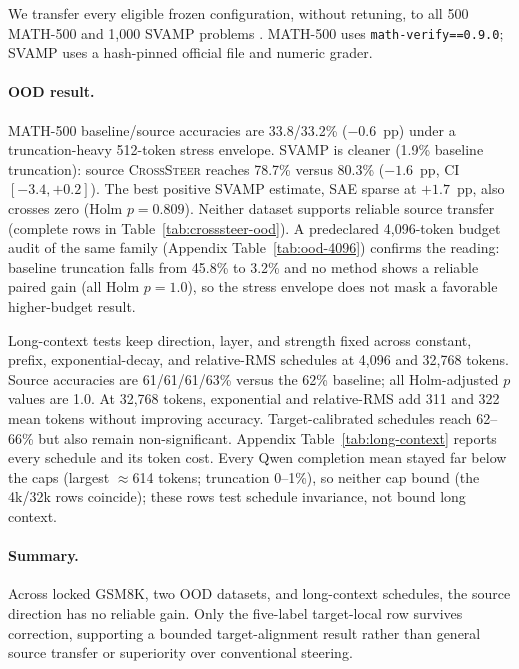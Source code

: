 We transfer every eligible frozen configuration, without retuning, to all 500
MATH-500 \citep{hendrycks2021measuring,lightman-verify-2023} and 1,000 SVAMP
problems \citep{patel-etal-2021-nlp}.  MATH-500 uses
\texttt{math-verify==0.9.0}; SVAMP uses a hash-pinned official file and numeric
grader.

\paragraph{OOD result.}
MATH-500 baseline/source accuracies are 33.8/33.2\% ($-0.6$~pp) under a
truncation-heavy 512-token stress envelope.  SVAMP is cleaner (1.9\% baseline
truncation): source \textsc{CrossSteer} reaches 78.7\% versus 80.3\%
($-1.6$~pp, CI $[-3.4,+0.2]$).  The best positive SVAMP estimate, SAE sparse at
$+1.7$~pp, also crosses zero (Holm $p=0.809$).  Neither dataset supports reliable
source transfer (complete rows in Table~\ref{tab:crosssteer-ood}).
A predeclared 4,096-token budget audit of the same
family (Appendix Table~\ref{tab:ood-4096}) confirms the reading: baseline
truncation falls from 45.8\% to 3.2\% and no method shows a reliable paired
gain (all Holm $p{=}1.0$), so the stress envelope does not mask a favorable
higher-budget result.

Long-context tests keep direction, layer, and strength fixed across constant,
prefix, exponential-decay, and relative-RMS schedules at 4,096 and 32,768
tokens.  Source accuracies are 61/61/61/63\% versus the 62\% baseline; all
Holm-adjusted $p$ values are 1.0.  At 32,768 tokens, exponential and relative-RMS
add 311 and 322 mean tokens without improving accuracy.  Target-calibrated
schedules reach 62--66\% but also remain non-significant. Appendix
Table~\ref{tab:long-context} reports every schedule and its token cost. Every
Qwen completion mean stayed far below the caps (largest $\approx$614
tokens; truncation 0--1\%), so neither cap bound (the 4k/32k rows coincide);
these rows test schedule invariance, not bound
long context.

\paragraph{Summary.}
Across locked GSM8K, two OOD datasets, and long-context schedules, the source
direction has no reliable gain.  Only the five-label target-local row survives
correction, supporting a bounded target-alignment result rather than general
source transfer or superiority over conventional steering.
